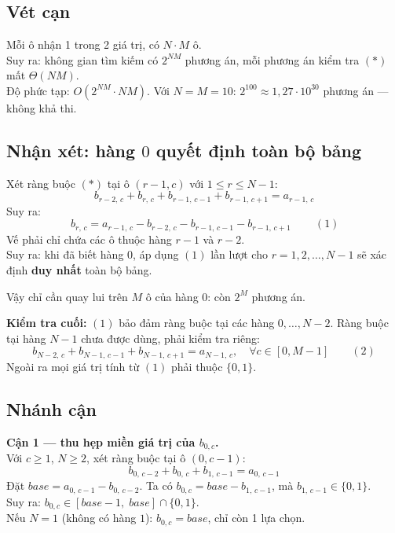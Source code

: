 \documentclass[12pt,a4paper]{article}
\begin{document}
\subsection{Vét cạn}
Mỗi ô nhận 1 trong 2 giá trị, có $N \cdot M$ ô. \\
Suy ra: không gian tìm kiếm có $2^{NM}$ phương án, mỗi phương án kiểm tra $(\ast)$ mất $\Theta(NM)$. \\
Độ phức tạp: $O(2^{NM} \cdot NM)$. Với $N = M = 10$: $2^{100} \approx 1{,}27 \cdot 10^{30}$ phương án --- không khả thi.

\subsection{Nhận xét: hàng $0$ quyết định toàn bộ bảng}
Xét ràng buộc $(\ast)$ tại ô $(r-1, c)$ với $1 \le r \le N-1$:
$$b_{r-2,\,c} + b_{r,\,c} + b_{r-1,\,c-1} + b_{r-1,\,c+1} = a_{r-1,\,c}$$
Suy ra:
$$\boxed{\,b_{r,\,c} = a_{r-1,\,c} - b_{r-2,\,c} - b_{r-1,\,c-1} - b_{r-1,\,c+1}\,} \qquad (1)$$
Vế phải chỉ chứa các ô thuộc hàng $r-1$ và $r-2$. \\
Suy ra: khi đã biết hàng $0$, áp dụng $(1)$ lần lượt cho $r = 1, 2, \dots, N-1$ sẽ xác định \textbf{duy nhất} toàn bộ bảng.

\noindent Vậy chỉ cần quay lui trên $M$ ô của hàng $0$: còn $2^M$ phương án.

\noindent\textbf{Kiểm tra cuối:} $(1)$ bảo đảm ràng buộc tại các hàng $0, \dots, N-2$. Ràng buộc tại hàng $N-1$ chưa được dùng, phải kiểm tra riêng:
$$b_{N-2,\,c} + b_{N-1,\,c-1} + b_{N-1,\,c+1} = a_{N-1,\,c}, \quad \forall c \in [0, M-1] \qquad (2)$$
Ngoài ra mọi giá trị tính từ $(1)$ phải thuộc $\{0, 1\}$.

\subsection{Nhánh cận}

\textbf{Cận 1 --- thu hẹp miền giá trị của $b_{0,c}$.} \\
Với $c \ge 1$, $N \ge 2$, xét ràng buộc tại ô $(0, c-1)$:
$$b_{0,\,c-2} + b_{0,\,c} + b_{1,\,c-1} = a_{0,\,c-1}$$
Đặt $\textit{base} = a_{0,\,c-1} - b_{0,\,c-2}$. Ta có $b_{0,c} = \textit{base} - b_{1,\,c-1}$, mà $b_{1,\,c-1} \in \{0, 1\}$. \\
Suy ra: $b_{0,c} \in [\textit{base} - 1,\; \textit{base}] \cap \{0, 1\}$. \\
Nếu $N = 1$ (không có hàng $1$): $b_{0,c} = \textit{base}$, chỉ còn 1 lựa chọn.
\end{document}
